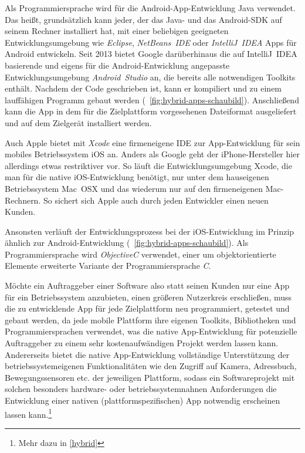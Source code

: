 Als Programmiersprache wird für die Android-App-Entwicklung Java verwendet. Das heißt, grundsätzlich kann jeder, der das Java- und das Android-SDK auf seinem Rechner installiert hat, mit einer beliebigen geeigneten Entwicklungsumgebung wie \emph{Eclipse}, \emph{NetBeans~IDE} oder \emph{IntelliJ~IDEA} Apps für Android entwickeln. 
Seit 2013 bietet Google darüberhinaus die auf IntelliJ~IDEA basierende und eigens für die Android-Entwicklung angepasste Entwicklungsumgebung \emph{Android~Studio} an,\cite{android-studio} die bereits alle notwendigen Toolkits enthält. 
Nachdem der Code geschrieben ist, kann er kompiliert und zu einem lauffähigen Programm gebaut werden (\seename\ \autoref{fig:hybrid-apps-schaubild}). Anschließend kann die App in dem für die Zielplattform vorgesehenen Dateiformat ausgeliefert und auf dem Zielgerät installiert werden.

Auch Apple bietet mit \emph{Xcode} eine firmeneigene IDE zur App-Entwicklung für sein mobiles Betriebssystem iOS an. Anders als Google geht der iPhone-Hersteller hier allerdings etwas restriktiver vor. So läuft die Entwicklungsumgebung Xcode, die man für die native iOS-Entwicklung benötigt, nur unter dem hauseigenen Betriebssystem Mac~OSX und das wiederum nur auf den firmeneigenen Mac-Rechnern. So sichert sich Apple auch durch jeden Entwickler einen neuen Kunden.

Ansonsten verläuft der Entwicklungsprozess bei der iOS-Entwicklung im Prinzip ähnlich zur Android-Entwicklung (\seename\ \autoref{fig:hybrid-apps-schaubild}).
Als Programmiersprache wird \emph{ObjectiveC} verwendet, einer um objektorientierte Elemente erweiterte Variante der Programmiersprache \emph{C}.

Möchte ein Auftraggeber einer Software also statt seinen Kunden nur eine App für ein Betriebssystem anzubieten, einen größeren Nutzerkreis erschließen, muss die zu entwicklende App für jede Zielplattform neu programmiert, getestet und gebaut werden, da jede mobile Plattform ihre eigenen Toolkits, Bibliotheken und Programmiersprachen verwendet, was die native App-Entwicklung für potenzielle Auftraggeber zu einem sehr kostenaufwändigen Projekt werden lassen kann.
Andererseits bietet die native App-Entwicklung vollständige Unterstützung der betriebssystemeigenen Funktionalitäten wie den Zugriff auf Kamera, Adressbuch, Bewegungssensoren etc. der jeweiligen Plattform, sodass ein Softwareprojekt mit solchen besonders hardware- oder betriebssystemnahnen Anforderungen die Entwicklung einer nativen (plattformspezifischen) App notwendig erscheinen lassen kann.\footnote{Mehr dazu in \autoref{hybrid}}

